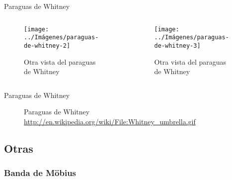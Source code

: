 \documentclass[10pt]{beamer}
\begin{document}
	\begin{frame}{Paraguas de Whitney}
		\begin{columns}[b] %
			\begin{column}{.50\textwidth}
				\begin{figure}
					\centering
					\texttt{[image: ../Imágenes/paraguas-de-whitney-2]}
					\caption{Otra vista del paraguas de Whitney}
					\label{fig:paraguas-de-Whitney-2}
				\end{figure}
			\end{column}%
			\hfill%
			\begin{column}{.50\textwidth}
				\begin{figure}
					\centering
					\texttt{[image: ../Imágenes/paraguas-de-whitney-3]}
					\caption{Otra vista del paraguas de Whitney}
					\label{fig:paraguas-de-Whitney-3}
				\end{figure}
			\end{column}%
		\end{columns}
	\end{frame}
	
	\begin{frame}{Paraguas de Whitney}
	\begin{figure}
		\centering
		\caption{Paraguas de Whitney \url{http://en.wikipedia.org/wiki/File:Whitney_umbrella.gif}}
		\label{fig:paraguas-de-Whitney-gif}
	\end{figure}
		
	\end{frame}
	
	\subsection{Otras}
	
	\subsubsection{Banda de Möbius}
	
\end{document}
